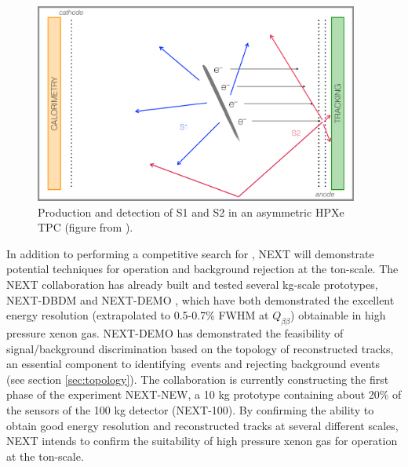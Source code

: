 \documentclass[a4paper,11pt]{article}
\begin{document}
\begin{figure}[!htb]
	\centering
	\includegraphics[width= 0.95\textwidth]{fig/SoftAsymmetric_bound.pdf}
	\caption{Production and detection of S1 and S2 in an asymmetric HPXe TPC (figure from \cite{MartinAlbo_thesis}).} \label{fig.SS}
\end{figure}

In addition to performing a competitive search for \bbonu, NEXT will demonstrate potential 
techniques for operation and background rejection at the ton-scale.  The NEXT collaboration has already built and tested several kg-scale prototypes, NEXT-DBDM \cite{Alvarez:2012kua} and
NEXT-DEMO \cite{Alvarez:2012xda,Alvarez:2012kua,Alvarez:2013gxa,Lorca:2014sra}, which have both demonstrated the excellent energy resolution (extrapolated to 0.5-0.7\% FWHM at
$Q_{\beta\beta}$) obtainable in high pressure xenon gas.  NEXT-DEMO has demonstrated the feasibility of signal/background discrimination based on the topology of reconstructed tracks,
an essential component to identifying \bbonu\,events and rejecting background events (see section \ref{sec:topology}).  The collaboration is currently constructing the first phase of the experiment NEXT-NEW, a 10 kg prototype 
containing about 20\% of the sensors of the 100 kg detector (NEXT-100).  By confirming the ability to obtain good energy resolution and reconstructed tracks at several different scales, NEXT 
intends to confirm the suitability of high pressure xenon gas for operation at the ton-scale.
\end{document}
